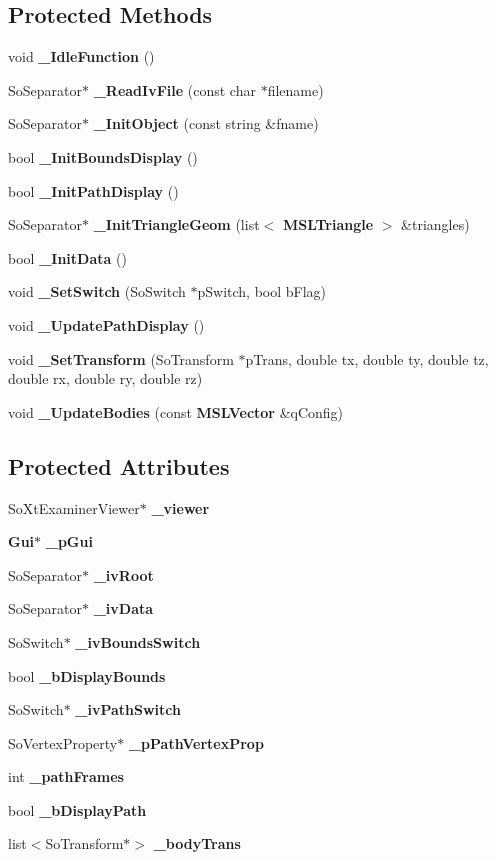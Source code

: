 \subsection*{Protected Methods}
\begin{CompactItemize}
\item 
void {\bf \_\-Idle\-Function} ()
\item 
So\-Separator$\ast$ {\bf \_\-Read\-Iv\-File} (const char $\ast$filename)
\item 
So\-Separator$\ast$ {\bf \_\-Init\-Object} (const string \&fname)
\item 
bool {\bf \_\-Init\-Bounds\-Display} ()
\item 
bool {\bf \_\-Init\-Path\-Display} ()
\item 
So\-Separator$\ast$ {\bf \_\-Init\-Triangle\-Geom} (list$<$ {\bf MSLTriangle} $>$ \&triangles)
\item 
bool {\bf \_\-Init\-Data} ()
\item 
void {\bf \_\-Set\-Switch} (So\-Switch $\ast$p\-Switch, bool b\-Flag)
\item 
void {\bf \_\-Update\-Path\-Display} ()
\item 
void {\bf \_\-Set\-Transform} (So\-Transform $\ast$p\-Trans, double tx, double ty, double tz, double rx, double ry, double rz)
\item 
void {\bf \_\-Update\-Bodies} (const {\bf MSLVector} \&q\-Config)
\end{CompactItemize}
\subsection*{Protected Attributes}
\begin{CompactItemize}
\item 
So\-Xt\-Examiner\-Viewer$\ast$ {\bf \_\-viewer}
\item 
{\bf Gui}$\ast$ {\bf \_\-p\-Gui}
\item 
So\-Separator$\ast$ {\bf \_\-iv\-Root}
\item 
So\-Separator$\ast$ {\bf \_\-iv\-Data}
\item 
So\-Switch$\ast$ {\bf \_\-iv\-Bounds\-Switch}
\item 
bool {\bf \_\-b\-Display\-Bounds}
\item 
So\-Switch$\ast$ {\bf \_\-iv\-Path\-Switch}
\item 
So\-Vertex\-Property$\ast$ {\bf \_\-p\-Path\-Vertex\-Prop}
\item 
int {\bf \_\-path\-Frames}
\item 
bool {\bf \_\-b\-Display\-Path}
\item 
list$<$So\-Transform$\ast$$>$ {\bf \_\-body\-Trans}
\end{CompactItemize}
